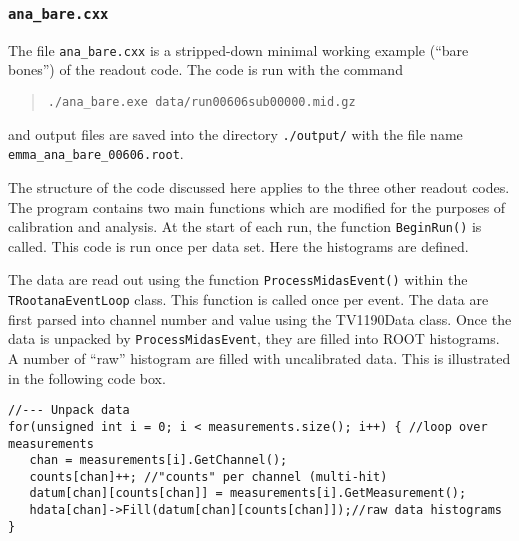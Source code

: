 \subsubsection{\texttt{ana\_bare.cxx}}
The file  \texttt{ana\_bare.cxx} is a stripped-down minimal working example (``bare bones'') of the readout code. 
The code is run with the command
\begin{quote}
  \begin{Verbatim}
./ana_bare.exe data/run00606sub00000.mid.gz   
\end{Verbatim}
\end{quote}
and output files are saved into the directory \verb|./output/| with the file name \verb|emma_ana_bare_00606.root|.


The structure of the code discussed here applies to the three other readout codes.
The program contains two main functions which are modified for the purposes of calibration and analysis.
At the start of each run, the function \verb|BeginRun()| is called. This code is run once per data set. Here the histograms are defined.

The data are read out using the function \texttt{ProcessMidasEvent()} within the \texttt{TRootanaEventLoop} class. This function is called once per event.
The data are first parsed into channel number and value using the TV1190Data class.   
Once the data is unpacked by \texttt{ProcessMidasEvent}, they are filled into ROOT histograms. 
A number of ``raw'' histogram are filled with uncalibrated data. This is illustrated in the following code box. %
\vspace{0.5\baselineskip}
\par\noindent
\begin{minipage}{\linewidth}
  \singlespace
\begin{lstlisting}[caption={Unpack data. Here for a given event, \texttt{chan} is a variable which takes the value of the channel number, %for which an event has been recorded,
 \texttt{counts} records the number hits per channel , \texttt{datum} is an array which stores all of the measurements for a given event,
 and \texttt{hdata} is a raw histogram of counts per channel. }]
//--- Unpack data
for(unsigned int i = 0; i < measurements.size(); i++) { //loop over measurements
   chan = measurements[i].GetChannel();
   counts[chan]++; //"counts" per channel (multi-hit)
   datum[chan][counts[chan]] = measurements[i].GetMeasurement();
   hdata[chan]->Fill(datum[chan][counts[chan]]);//raw data histograms
}
\end{lstlisting}
\end{minipage}


